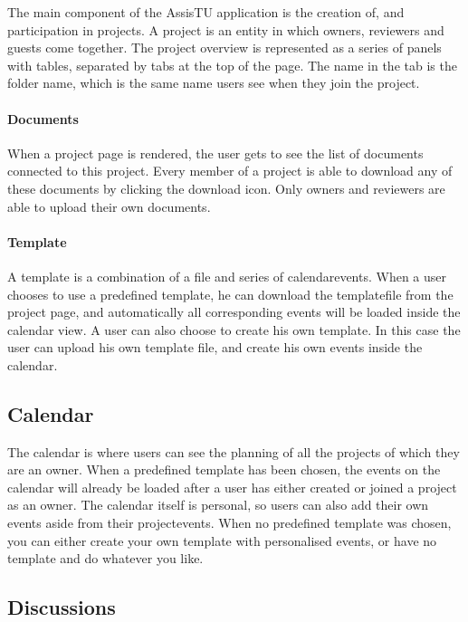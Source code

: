 The main component of the AssisTU application is the creation of, and participation in projects. A project is an entity in which owners, reviewers and guests come together. 
The project overview is represented as a series of panels with tables, separated by tabs at the top of the page. The name in the tab is the folder name, which is the same name users see when they join the project. 

\paragraph{Documents}

When a project page is rendered, the user gets to see the list of documents connected to this project. Every member of a project is able to download
any of these documents by clicking the download icon. Only owners and reviewers are able to upload their own documents.

\paragraph{Template}

A template is a combination of a file and series of calendarevents. When a user chooses to use a predefined template, he can download the templatefile
from the project page, and automatically all corresponding events will be loaded inside the calendar view. A user can also choose to create his own template. In this case the user can upload his own template file, and create his own events inside the calendar.

\subsection*{Calendar}

The calendar is where users can see the planning of all the projects of which they are an owner.
When a predefined template has been chosen, the events on the calendar will already be loaded after
a user has either created or joined a project as an owner. The calendar itself is personal, so users can also add their own events aside from their projectevents. When no predefined template was chosen, you can either
create your own template with personalised events, or have no template and do whatever you like.

\subsection*{Discussions}

